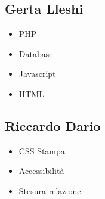 \subsection{Gerta Lleshi}

\begin{itemize}
	\item PHP
	\item Database
	\item Javascript
	\item HTML
\end{itemize}

\subsection{Riccardo Dario}

\begin{itemize}
	\item CSS Stampa
	\item Accessibilità
	\item Stesura relazione
\end{itemize}


